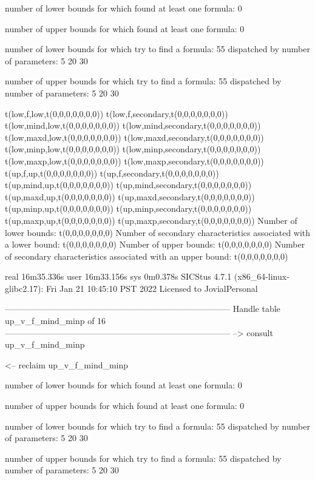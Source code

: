 number of lower bounds for which found at least one formula: 0

number of upper bounds for which found at least one formula: 0

number of lower bounds for which try to find a formula: 55
dispatched by number of parameters: 5  20  30

number of upper bounds for which try to find a formula: 55
dispatched by number of parameters: 5  20  30

t(low,f,low,t(0,0,0,0,0,0,0))
t(low,f,secondary,t(0,0,0,0,0,0,0))
t(low,mind,low,t(0,0,0,0,0,0,0))
t(low,mind,secondary,t(0,0,0,0,0,0,0))
t(low,maxd,low,t(0,0,0,0,0,0,0))
t(low,maxd,secondary,t(0,0,0,0,0,0,0))
t(low,minp,low,t(0,0,0,0,0,0,0))
t(low,minp,secondary,t(0,0,0,0,0,0,0))
t(low,maxp,low,t(0,0,0,0,0,0,0))
t(low,maxp,secondary,t(0,0,0,0,0,0,0))
t(up,f,up,t(0,0,0,0,0,0,0))
t(up,f,secondary,t(0,0,0,0,0,0,0))
t(up,mind,up,t(0,0,0,0,0,0,0))
t(up,mind,secondary,t(0,0,0,0,0,0,0))
t(up,maxd,up,t(0,0,0,0,0,0,0))
t(up,maxd,secondary,t(0,0,0,0,0,0,0))
t(up,minp,up,t(0,0,0,0,0,0,0))
t(up,minp,secondary,t(0,0,0,0,0,0,0))
t(up,maxp,up,t(0,0,0,0,0,0,0))
t(up,maxp,secondary,t(0,0,0,0,0,0,0))
Number of lower bounds:                                             t(0,0,0,0,0,0,0)
Number of secondary characteristics associated with a lower bound:  t(0,0,0,0,0,0,0)
Number of upper bounds:                                             t(0,0,0,0,0,0,0)
Number of secondary characteristics associated with an upper bound: t(0,0,0,0,0,0,0)

real	16m35.336s
user	16m33.156s
sys	0m0.378s
SICStus 4.7.1 (x86_64-linux-glibc2.17): Fri Jan 21 10:45:10 PST 2022
Licensed to JovialPersonal


--------------------------------------------------------------------------------
Handle table up_v_f_mind_minp of 16
--------------------------------------------------------------------------------
--> consult up_v_f_mind_minp

<-- reclaim up_v_f_mind_minp

number of lower bounds for which found at least one formula: 0

number of upper bounds for which found at least one formula: 0

number of lower bounds for which try to find a formula: 55
dispatched by number of parameters: 5  20  30

number of upper bounds for which try to find a formula: 55
dispatched by number of parameters: 5  20  30

